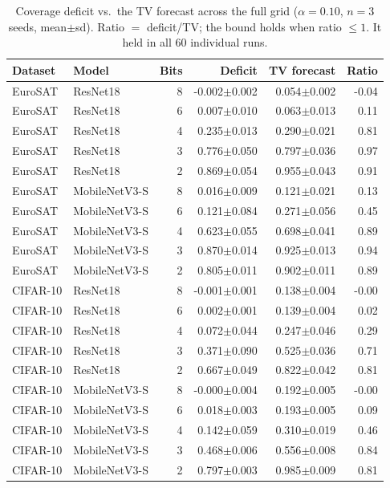\begin{table}[t]\centering\small
\caption{Coverage deficit vs.\ the TV forecast across the full grid ($\alpha{=}0.10$, $n{=}3$ seeds, mean$\pm$sd). Ratio $=$ deficit/TV; the bound holds when ratio $\le 1$. It held in all 60 individual runs.}
\label{tab:grid}
\begin{tabular}{llrrrr}\toprule
Dataset & Model & Bits & Deficit & TV forecast & Ratio\\ \midrule
EuroSAT & ResNet18 & 8 & -0.002$\pm$0.002 & 0.054$\pm$0.002 & -0.04\\
EuroSAT & ResNet18 & 6 & 0.007$\pm$0.010 & 0.063$\pm$0.013 & 0.11\\
EuroSAT & ResNet18 & 4 & 0.235$\pm$0.013 & 0.290$\pm$0.021 & 0.81\\
EuroSAT & ResNet18 & 3 & 0.776$\pm$0.050 & 0.797$\pm$0.036 & 0.97\\
EuroSAT & ResNet18 & 2 & 0.869$\pm$0.054 & 0.955$\pm$0.043 & 0.91\\
\midrule
EuroSAT & MobileNetV3-S & 8 & 0.016$\pm$0.009 & 0.121$\pm$0.021 & 0.13\\
EuroSAT & MobileNetV3-S & 6 & 0.121$\pm$0.084 & 0.271$\pm$0.056 & 0.45\\
EuroSAT & MobileNetV3-S & 4 & 0.623$\pm$0.055 & 0.698$\pm$0.041 & 0.89\\
EuroSAT & MobileNetV3-S & 3 & 0.870$\pm$0.014 & 0.925$\pm$0.013 & 0.94\\
EuroSAT & MobileNetV3-S & 2 & 0.805$\pm$0.011 & 0.902$\pm$0.011 & 0.89\\
\midrule
CIFAR-10 & ResNet18 & 8 & -0.001$\pm$0.001 & 0.138$\pm$0.004 & -0.00\\
CIFAR-10 & ResNet18 & 6 & 0.002$\pm$0.001 & 0.139$\pm$0.004 & 0.02\\
CIFAR-10 & ResNet18 & 4 & 0.072$\pm$0.044 & 0.247$\pm$0.046 & 0.29\\
CIFAR-10 & ResNet18 & 3 & 0.371$\pm$0.090 & 0.525$\pm$0.036 & 0.71\\
CIFAR-10 & ResNet18 & 2 & 0.667$\pm$0.049 & 0.822$\pm$0.042 & 0.81\\
\midrule
CIFAR-10 & MobileNetV3-S & 8 & -0.000$\pm$0.004 & 0.192$\pm$0.005 & -0.00\\
CIFAR-10 & MobileNetV3-S & 6 & 0.018$\pm$0.003 & 0.193$\pm$0.005 & 0.09\\
CIFAR-10 & MobileNetV3-S & 4 & 0.142$\pm$0.059 & 0.310$\pm$0.019 & 0.46\\
CIFAR-10 & MobileNetV3-S & 3 & 0.468$\pm$0.006 & 0.556$\pm$0.008 & 0.84\\
CIFAR-10 & MobileNetV3-S & 2 & 0.797$\pm$0.003 & 0.985$\pm$0.009 & 0.81\\
\bottomrule
\end{tabular}\end{table}
